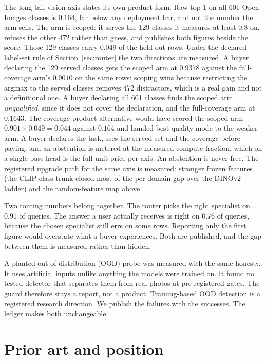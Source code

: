 \documentclass[11pt]{article}
\begin{document}
The long-tail vision axis states its own product form. Raw top-1
on all 601 Open Images classes is $0.164$, far below any
deployment bar, and not the number the arm sells. The arm is
scoped: it serves the 129 classes it measures at least $0.8$ on,
refuses the other 472 rather than guess, and publishes both
figures beside the score. Those 129 classes carry $0.049$ of the
held-out rows. Under the declared-label-set rule of
Section~\ref{sec:router} the two directions are measured. A buyer
declaring the 129 served classes gets the scoped arm at $0.9378$
against the full-coverage arm's $0.9010$ on the same rows: scoping
wins because restricting the argmax to the served classes removes
472 distractors, which is a real gain and not a definitional one.
A buyer declaring all 601 classes finds the scoped arm
\emph{unqualified}, since it does not cover the declaration, and
the full-coverage arm at $0.1643$. The coverage-product
alternative would have scored the scoped arm
$0.901 \times 0.049 = 0.044$ against $0.164$ and handed
best-quality mode to the weaker arm.
A buyer
declares the task, sees the served set and the coverage before
paying, and an abstention is metered at the measured compute
fraction, which on a single-pass head is the full unit price per
axis. An abstention is never free. The registered upgrade path
for the same axis is measured: stronger frozen features (the
CLIP-class trunk closed most of the per-domain gap over the
DINOv2 ladder) and the random-feature map above.

Two routing numbers belong together. The router picks the right
specialist on 0.91 of queries. The answer a user actually
receives is right on 0.76 of queries, because the chosen
specialist still errs on some rows. Reporting only the first
figure would overstate what a buyer experiences. Both are
published, and the gap between them is measured rather than
hidden.

A planted out-of-distribution (OOD) probe was measured with the
same honesty. It uses artificial inputs
unlike anything the models were trained on. It found no tested
detector that separates them from real photos at pre-registered
gates. The guard therefore stays a report, not a product.
Training-based OOD detection is a registered research direction.
We publish the failures with the successes. The ledger makes both
unchangeable.

\section{Prior art and position}
\end{document}
